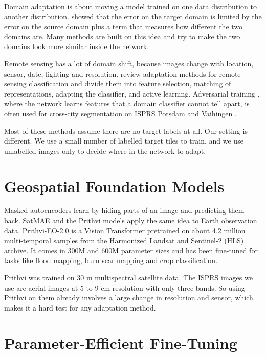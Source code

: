 \documentclass[11pt,a4paper]{report}
\begin{document}
Domain adaptation is about moving a model trained on one data distribution to another distribution. \citet{bendavid2010theory} showed that the error on the target domain is limited by the error on the source domain plus a term that measures how different the two domains are. Many methods are built on this idea and try to make the two domains look more similar inside the network.

Remote sensing has a lot of domain shift, because images change with location, sensor, date, lighting and resolution. \citet{tuia2016domain} review adaptation methods for remote sensing classification and divide them into feature selection, matching of representations, adapting the classifier, and active learning. Adversarial training \cite{ganin2016domain}, where the network learns features that a domain classifier cannot tell apart, is often used for cross-city segmentation on ISPRS Potsdam and Vaihingen \cite{rottensteiner2012isprs}.

Most of these methods assume there are no target labels at all. Our setting is different. We use a small number of labelled target tiles to train, and we use unlabelled images only to decide where in the network to adapt.

\section{Geospatial Foundation Models}

Masked autoencoders \cite{he2022masked} learn by hiding parts of an image and predicting them back. SatMAE \cite{cong2022satmae} and the Prithvi models \cite{jakubik2023foundation} apply the same idea to Earth observation data. Prithvi-EO-2.0 \cite{szwarcman2024prithvi} is a Vision Transformer pretrained on about 4.2 million multi-temporal samples from the Harmonized Landsat and Sentinel-2 (HLS) archive. It comes in 300M and 600M parameter sizes and has been fine-tuned for tasks like flood mapping, burn scar mapping and crop classification.

Prithvi was trained on 30 m multispectral satellite data. The ISPRS images we use are aerial images at 5 to 9 cm resolution with only three bands. So using Prithvi on them already involves a large change in resolution and sensor, which makes it a hard test for any adaptation method.

\section{Parameter-Efficient Fine-Tuning}
\end{document}
